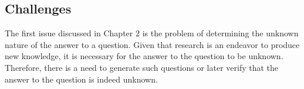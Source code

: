 







\subsection{Challenges}
The first issue discussed in Chapter 2 is the problem of determining the unknown nature of the answer to a question. Given that research is an endeavor to produce new knowledge, it is necessary for the answer to the question to be unknown. Therefore, there is a need to generate such questions or later verify that the answer to the question is indeed unknown.

